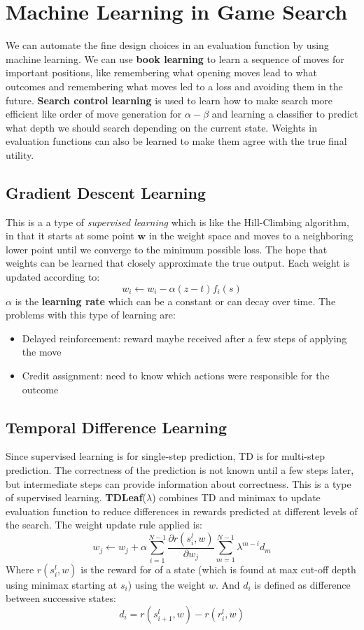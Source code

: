 \documentclass[twoside]{article}
\begin{document}
\section{Machine Learning in Game Search}
We can automate the fine design choices in an evaluation function by using 
machine learning. We can use \textbf{book learning} to learn a sequence of
moves for important positions, like remembering what opening moves lead to 
what outcomes and remembering what moves led to a loss and avoiding them in
the future. \textbf{Search control learning} is used to learn how to make
search more efficient like order of move generation for \(\alpha-\beta\) and
learning a classifier to predict what depth we should search depending on the
current state. Weights in evaluation functions can also be learned to make
them agree with the true final utility.
\subsection{Gradient Descent Learning}
This is a a type of \emph{supervised learning} which is like the Hill-Climbing
algorithm, in that it starts at some point \(\mathbf w\) in the weight space and moves
to a neighboring lower point until we converge to the minimum possible loss.
The hope that weights can be learned that closely approximate the true output.
Each weight is updated according to:
\begin{equation}
        w_i \leftarrow w_i - \alpha (z - t)f_i(s)
\end{equation}
\(\alpha\) is the \textbf{learning rate} which can be a constant or can decay
over time. The problems with this type of learning are:
\begin{itemize}
        \item Delayed reinforcement: reward maybe received after a few steps
        of applying the move
        \item Credit assignment: need to know which actions were responsible
        for the outcome
\end{itemize}
\subsection{Temporal Difference Learning}
Since supervised learning is for single-step prediction, TD is for multi-step
prediction. The correctness of the prediction is not known until a few steps
later, but intermediate steps can provide information about correctness. This
is a type of supervised learning. \textbf{TDLeaf}(\(\lambda\)) combines TD
and minimax to update evaluation function to reduce differences in rewards 
predicted at different levels of the search. The weight update rule applied is:
\begin{equation}
        w_j \leftarrow w_j + \alpha \sum_{i=1}^{N-1}\frac{\partial r(s_i^l, w)}{\partial w_j}\sum_{m=1}^{N-1}\lambda^{m-i}d_m
\end{equation}
Where \(r(s^l_i, w)\) is the reward for of a state (which is found at max cut-off
depth using minimax starting at \(s_i\)) using the weight \(w\). And \(d_i\) is
defined as difference between successive states:
\begin{equation}
        d_i = r(s^l_{i+1}, w) - r(r^l_i, w)
\end{equation}
\end{document}
